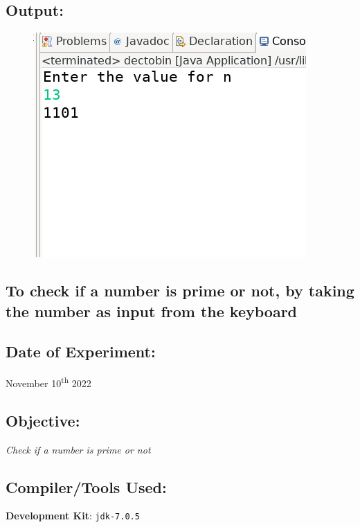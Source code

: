 \documentclass[12pt, a4paper]{article}
\begin{document}
\subsection*{Output:}
\begin{figure}[h]
  \centering
  \includegraphics[width=\textwidth]{dectobin}
\end{figure}
\newpage

\begin{tcolorbox}
\section{To check if a number is prime or not, by taking the number as input from the keyboard}
\end{tcolorbox}
\subsection*{Date of Experiment:}
November 10\textsuperscript{th} 2022


\subsection*{Objective:}
\emph{\large{Check if a number is prime or not}}

\subsection*{Compiler/Tools Used:}
\textbf{Development Kit}: \verb+jdk-7.0.5+
\end{document}
